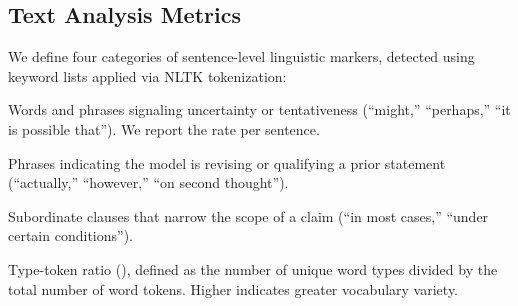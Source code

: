\subsection{Text Analysis Metrics}
\label{sec:text_metrics}

We define four categories of sentence-level linguistic markers, detected using keyword lists applied via NLTK tokenization:

Words and phrases signaling uncertainty or tentativeness (\eg ``might,'' ``perhaps,'' ``it is possible that'').
We report the rate per sentence.

Phrases indicating the model is revising or qualifying a prior statement (\eg ``actually,'' ``however,'' ``on second thought'').

Subordinate clauses that narrow the scope of a claim (\eg ``in most cases,'' ``under certain conditions'').

Type-token ratio (\ttr), defined as the number of unique word types divided by the total number of word tokens.
Higher \ttr indicates greater vocabulary variety.
